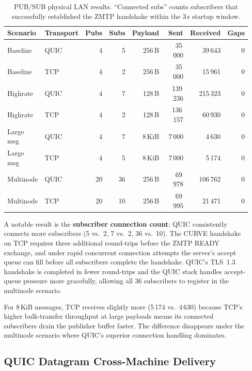 \documentclass[12pt, a4paper, oneside]{report}
\begin{document}
\begin{table}[H]
  \centering
  \caption{PUB/SUB physical LAN results. ``Connected subs'' counts subscribers that successfully established the ZMTP handshake within the 3\,s startup window.}
  \label{tab:phys-pubsub}
  \begin{tabular}{llrrrrrr}
    \toprule
    \textbf{Scenario} & \textbf{Transport} & \textbf{Pubs} & \textbf{Subs} & \textbf{Payload} & \textbf{Sent} & \textbf{Received} & \textbf{Gaps} \\
    \midrule
    Baseline         & QUIC &  4 &  5 & 256\,B & 35\,000  &  39\,643 & 0 \\
    Baseline         & TCP  &  4 &  2 & 256\,B & 35\,000  &  15\,961 & 0 \\
    Highrate         & QUIC &  4 &  7 & 128\,B & 139\,236 & 215\,323 & 0 \\
    Highrate         & TCP  &  4 &  2 & 128\,B & 136\,157 &  60\,930 & 0 \\
    Large msg        & QUIC &  4 &  7 &  8\,KiB &  7\,000  &   4\,630 & 0 \\
    Large msg        & TCP  &  4 &  5 &  8\,KiB &  7\,000  &   5\,174 & 0 \\
    Multinode        & QUIC & 20 & 36 & 256\,B & 69\,978  & 106\,762 & 0 \\
    Multinode        & TCP  & 20 & 10 & 256\,B & 69\,995  &  21\,471 & 0 \\
    \bottomrule
  \end{tabular}
\end{table}

A notable result is the \textbf{subscriber connection count}: QUIC consistently connects more subscribers (5 vs.\ 2, 7 vs.\ 2, 36 vs.\ 10). The CURVE handshake on TCP requires three additional round-trips before the ZMTP READY exchange, and under rapid concurrent connection attempts the server's accept queue can fill before all subscribers complete the handshake. QUIC's TLS~1.3 handshake is completed in fewer round-trips and the QUIC stack handles accept-queue pressure more gracefully, allowing all 36 subscribers to register in the multinode scenario.

For 8\,KiB messages, TCP receives slightly more (5\,174 vs.\ 4\,630) because TCP's higher bulk-transfer throughput at large payloads means its connected subscribers drain the publisher buffer faster. The difference disappears under the multinode scenario where QUIC's superior connection handling dominates.

\subsection{QUIC Datagram Cross-Machine Delivery}
\label{sec:phys-datagram}
\end{document}
